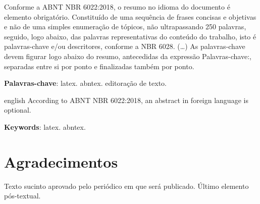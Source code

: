 \documentclass[
	article,			%
	11pt,				%
	oneside,			%
	a4paper,			%
	english,			%
	brazil,				%
	sumario=tradicional
	]{abntex2}
\begin{document}
\frenchspacing
%
\maketitle

\begin{resumoumacoluna}
	Conforme a ABNT NBR 6022:2018, o resumo no idioma do documento é elemento obrigatório.
	Constituído de uma sequência de frases concisas e objetivas e não de uma simples enumeração de tópicos, não ultrapassando 250 palavras, seguido, logo abaixo, das palavras representativas do conteúdo do trabalho, isto é palavras-chave e/ou descritores, conforme a NBR 6028. (\ldots)
	As palavras-chave devem figurar logo abaixo do resumo, antecedidas da expressão Palavras-chave:, separadas entre si por ponto e finalizadas também por ponto.

	\vspace{\onelineskip}

	\noindent
	\textbf{Palavras-chave}: latex. abntex. editoração de texto.
\end{resumoumacoluna}

\renewcommand{\resumoname}{Abstract}
\begin{resumoumacoluna}
	\begin{otherlanguage*}{english}
		According to ABNT NBR 6022:2018, an abstract in foreign language is optional.

		\vspace{\onelineskip}

		\noindent
		\textbf{Keywords}: latex. abntex.
	\end{otherlanguage*}
\end{resumoumacoluna}

\textual
%




\postextual
% 

% 
\section*{Agradecimentos}
Texto sucinto aprovado pelo periódico em que será publicado. Último elemento pós-textual.
%
\end{document}
